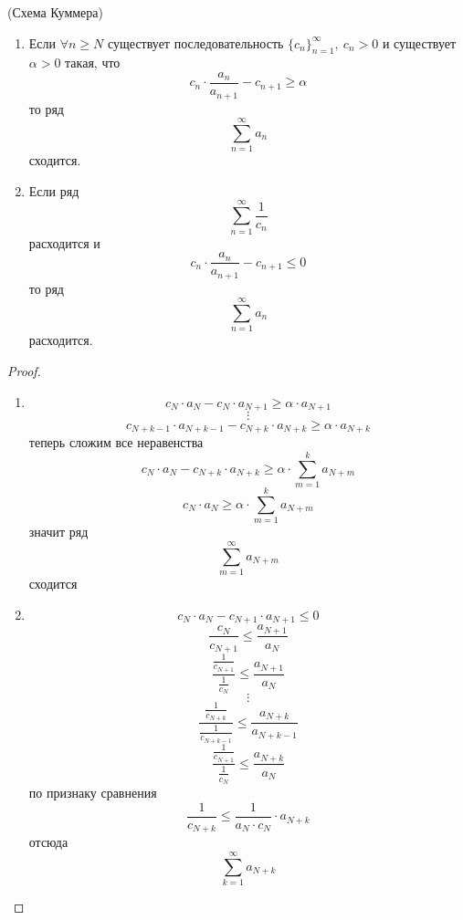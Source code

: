 \begin{theorem} (Схема Куммера)\\
    \begin{enumerate}
        \item Если $\forall n\geq N$ существует последовательность $\{c_n\}_{n=1}^{\infty},\ c_n>0$ и существует $\alpha>0$ такая, что
        \[c_n\cdot \frac{a_n}{a_{n+1}}-c_{n+1}\geq \alpha\]
        то ряд
        \[\sum_{n=1}^{\infty}a_n\]
        сходится.
        \item Если ряд
    \[\sum_{n=1}^{\infty}\frac{1}{c_n}\]
    расходится и 
    \[c_n\cdot \frac{a_n}{a_{n+1}}-c_{n+1}\leq 0\]
    то ряд
    \[\sum_{n=1}^{\infty}a_n\]
    расходится.
    \end{enumerate}
\end{theorem}
\begin{proof}
    \begin{enumerate}
        \item \[c_N\cdot a_N-c_N\cdot a_{N+1}\geq \alpha\cdot a_{N+1}\]
        \[\vdots\]
        \[c_{N+k-1}\cdot a_{N+k-1}-c_{N+k}\cdot a_{N+k}\geq \alpha\cdot a_{N+k}\]
        теперь сложим все неравенства
        \[c_N\cdot a_N-c_{N+k}\cdot a_{N+k}\geq \alpha\cdot \sum_{m=1}^{k}a_{N+m}\]
        \[c_N\cdot a_N\geq \alpha\cdot \sum_{m=1}^{k}a_{N+m}\]
        значит ряд
        \[\sum_{m=1}^{\infty}a_{N+m}\]
        сходится
        \item 
        \[c_N\cdot a_N-c_{N+1}\cdot a_{N+1}\leq 0\]
        \[\frac{c_N}{c_{N+1}}\leq \frac{a_{N+1}}{a_N}\]
        \[\frac{\frac{1}{c_{N+1}}}{\frac{1}{c_N}}\leq \frac{a_{N+1}}{a_N}\]
        \[\vdots\]
        \[\frac{\frac{1}{c_{N+k}}}{\frac{1}{c_{N+k-1}}}\leq \frac{a_{N+k}}{a_{N+k-1}}\]
        \[\frac{\frac{1}{c_{N+1}}}{\frac{1}{c_N}}\leq \frac{a_{N+k}}{a_N}\]
        по признаку сравнения
        \[\frac{1}{c_{N+k}}\leq \frac{1}{a_N\cdot c_N}\cdot a_{N+k}\]
        отсюда
        \[\sum_{k=1}^{\infty}a_{N+k}\]
    \end{enumerate}
\end{proof}
